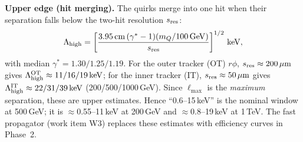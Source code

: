 \documentclass[11pt,a4paper]{article}
\newcommand{\mQ}{m_Q}
\newcommand{\GeV}{\,\mathrm{GeV}}
\newcommand{\keV}{\,\mathrm{keV}}
\newcommand{\um}{\,\mu\mathrm{m}}
\begin{document}
\textbf{Upper edge (hit merging).} The quirks merge into one hit when their separation falls below the two-hit resolution $s_{\rm res}$:
\begin{equation}
\Lambda_{\rm high}=\left[\frac{3.95\,\mathrm{cm}\,(\gamma^*-1)(\mQ/100\GeV)}{s_{\rm res}}\right]^{1/2}\keV ,
\end{equation}
with median $\gamma^*=1.30/1.25/1.19$. For the outer tracker (OT) $r\phi$, $s_{\rm res}\approx200\um$ gives $\Lambda_{\rm high}^{\rm OT}\approx11/16/19\keV$; for the inner tracker (IT), $s_{\rm res}\approx50\um$ gives $\Lambda_{\rm high}^{\rm IT}\approx22/31/39\keV$ (200/500/1000\,GeV). Since $\ell_{\max}$ is the \emph{maximum} separation, these are upper estimates. Hence ``0.6--15\,keV'' is the nominal window at 500\,GeV; it is $\approx$0.55--11\,keV at 200\,GeV and $\approx$0.8--19\,keV at 1\,TeV. The fast propagator (work item W3) replaces these estimates with efficiency curves in Phase~2.
\end{document}
